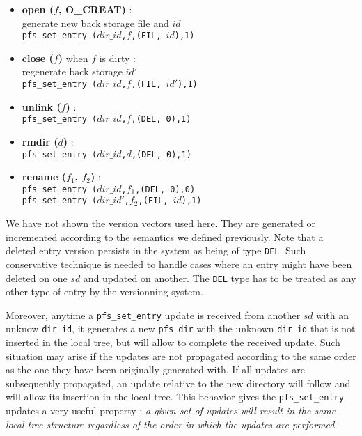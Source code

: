 \begin{itemize}
  \item \textbf{open ($f$, O\_CREAT)} : \\
    generate new back storage file and $id$ \\
    {\tt pfs\_set\_entry ($dir\_id$,$f$,(FIL, $id$),1)}

  \item \textbf{close ($f$)} when $f$ is dirty : \\
    regenerate back storage $id'$ \\
    {\tt pfs\_set\_entry ($dir\_id$,$f$,(FIL, $id'$),1)}
    
  \item \textbf{unlink ($f$)} : \\
    {\tt pfs\_set\_entry ($dir\_id$,$f$,(DEL, 0),1)}

  \item \textbf{rmdir ($d$)} : \\
    {\tt pfs\_set\_entry ($dir\_id$,$d$,(DEL, 0),1)}

  \item \textbf{rename ($f_1$, $f_2$)} : \\
    {\tt pfs\_set\_entry ($dir\_id$,$f_1$,(DEL, 0),0)} \\
    {\tt pfs\_set\_entry ($dir\_id'$,$f_2$,(FIL, $id$),1)}
\end{itemize}

We have not shown the version vectors used here. They are generated or
incremented according to the semantics we defined previously. Note
that a deleted entry version persists in the system as being of type
{\tt DEL}. Such conservative technique is needed to handle cases where
an entry might have been deleted on one $sd$ and updated on
another. The {\tt DEL} type has to be treated as any other type of
entry by the versionning system.

Moreover, anytime a {\tt pfs\_set\_entry} update is received from
another $sd$ with an unknow {\tt dir\_id}, it generates a new {\tt pfs\_dir}
with the unknown {\tt dir\_id} that is not inserted in the local tree, but
will allow to complete the received update. Such situation may arise
if the updates are not propagated according to the same order as the one they
have been originally generated with. If all updates are subsequently
propagated, an update relative to the new directory will follow and will
allow its insertion in the local tree. This behavior gives the 
{\tt pfs\_set\_entry} updates a very useful property : \emph{a given set of
updates will result in the same local tree structure regardless of the
order in which the updates are performed.}

